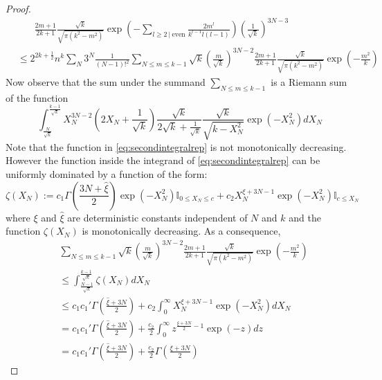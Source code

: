 \documentclass[12pt]{article}
\numberwithin{equation}{section}
\numberwithin{equation}{section}
\theoremstyle{definition}
\renewcommand{\1}{\bf 1}
\begin{document}
\begin{proof}
\begin{equation}
\begin{split}
&~~~~~~~~\frac{2m+1}{2k+1}\frac{\sqrt{k}}{\sqrt{\pi(k^2-m^2)}}\exp\left(- \sum_{l\ge 2~|~ \text{even}}\frac{2m^{l}}{k^{l-1}l(l-1)}\right)\left(\frac{1}{\sqrt{k}}\right)^{3N-3}\\
& \le 2^{2k+\frac{1}{2}}n^{k}\sum_{N}3^{N}\frac{1}{(N-1)!^2}\sum_{N\le m \le k-1} {\sqrt{k}} \left(\frac{m}{\sqrt{k}}\right)^{3N-2}\frac{2m+1}{2k+1}\frac{\sqrt{k}}{\sqrt{\pi(k^2-m^2)}}\exp\left(-\frac{m^{2}}{k}\right)
\end{split}
\end{equation}
Now observe that the sum under the summand $\sum_{N\le m \le k-1}$ is a Riemann sum of the function
\begin{equation}\label{eq:secondintegralrep}
\int_{\frac{N}{\sqrt{k}}}^{\frac{k-1}{\sqrt{k}}} X_{N}^{3N-2}\left( 2X_{N} + \frac{1}{\sqrt{k}} \right) \frac{\sqrt{k}}{2\sqrt{k}+ \frac{1}{\sqrt{k}}}\frac{\sqrt{k}}{\sqrt{k-X_{N}^2}}\exp\left( -  X_{N}^{2} \right)dX_{N}
\end{equation} 
Note that the function in \eqref{eq:secondintegralrep} is not monotonically decreasing. However the function inside the integrand of \eqref{eq:secondintegralrep} can be uniformly dominated by a function of the form: 
\begin{equation}\label{eq:integraldom}
\zeta(X_{N}):=c_{1}\Gamma\left( \frac{3N+ \hat{\xi}}{2} \right)\exp\left( - X_{N}^2 \right)\mathbb{I}_{0\le X_{N}\le c}+ c_{2}X_{N}^{\xi+3N-1}\exp\left( - X_{N}^{2} \right)\mathbb{I}_{c\le X_{N}}
\end{equation} 
where $\xi$ and $\hat{\xi}$ are deterministic constants independent of $N$ and $k$ and the function $\zeta(X_{N})$ is monotonically decreasing.
As a consequence, 
\begin{equation}
\begin{split}
&\sum_{N\le m \le k-1} {\sqrt{k}} \left(\frac{m}{\sqrt{k}}\right)^{3N-2}\frac{2m+1}{2k+1}\frac{\sqrt{k}}{\sqrt{\pi(k^2-m^2)}}\exp\left(-\frac{m^{2}}{k}\right)\\
&\le \int_{\frac{N-1}{\sqrt{k}}}^{\frac{k-1}{\sqrt{k}}} \zeta(X_{N})dX_{N}\\
&\le c_{1}c_{1}'\Gamma\left( \frac{\hat{\xi}+3N}{2}\right)+  c_{2}\int_{0}^{\infty} X_{N}^{\xi+3N-1}\exp\left( - X_{N}^{2} \right)dX_{N}\\
&=c_{1}c_{1}'\Gamma\left( \frac{\hat{\xi}+3N}{2}\right)+ \frac{c_{2}}{2} \int_{0}^{\infty} z^{\frac{\xi + 3N}{2}-1}\exp(-z)dz\\
&= c_{1}c_{1}'\Gamma\left( \frac{\hat{\xi}+3N}{2}\right) + \frac{c_{2}}{2} \Gamma\left(\frac{\xi+3N}{2}\right) 

\end{split}
\end{equation}
\end{proof}
\end{document}
